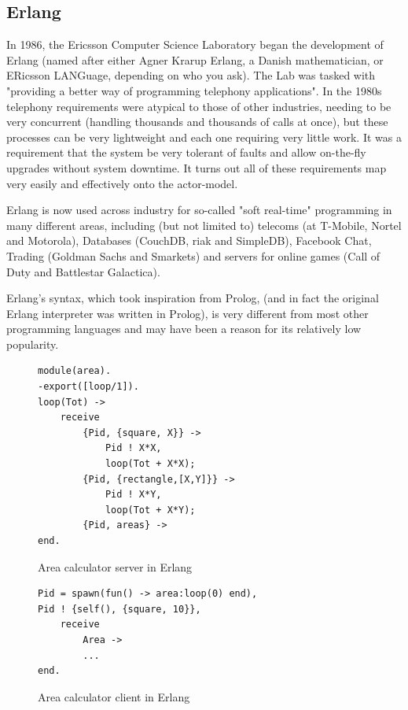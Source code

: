 \documentclass[pdftex,11pt,a4paper]{report}
\begin{document}
\subsection{Erlang}

In 1986, the Ericsson Computer Science Laboratory began the development of Erlang\cite{armstrong2007} (named after either Agner Krarup Erlang, a Danish mathematician, or ERicsson LANGuage, depending on who you ask).
The Lab was tasked with "providing a better way of programming telephony applications".
In the 1980s telephony requirements were atypical to those of other industries, needing to be very concurrent (handling thousands and thousands of calls at once), but these processes can be very lightweight and each one requiring very little work.
It was a requirement that the system be very tolerant of faults and allow on-the-fly upgrades without system downtime.
It turns out all of these requirements map very easily and effectively onto the actor-model.

Erlang is now used across industry for so-called "soft real-time" programming in many different areas, including (but not limited to) telecoms (at T-Mobile, Nortel and Motorola), Databases (CouchDB, riak and SimpleDB), Facebook Chat, Trading (Goldman Sachs and Smarkets) and servers for online games (Call of Duty and Battlestar Galactica).

Erlang's syntax, which took inspiration from Prolog, (and in fact the original Erlang interpreter was written in Prolog), is very different from most other programming languages and may have been a reason for its relatively low popularity.

\begin{figure}[H]
\begin{verbatim}
module(area).
-export([loop/1]).
loop(Tot) ->
    receive
        {Pid, {square, X}} ->
            Pid ! X*X,
            loop(Tot + X*X);
        {Pid, {rectangle,[X,Y]}} ->
            Pid ! X*Y,
            loop(Tot + X*Y);
        {Pid, areas} ->
end.
\end{verbatim}
\caption{Area calculator server in Erlang}
\label{fig:example_erlang_server}
\end{figure}

\begin{figure}[H]
\begin{verbatim}
Pid = spawn(fun() -> area:loop(0) end),
Pid ! {self(), {square, 10}},
    receive
        Area ->
        ...
end.
\end{verbatim}
\caption{Area calculator client in Erlang}
\label{fig:example_erlang_client}
\end{figure}
\end{document}
